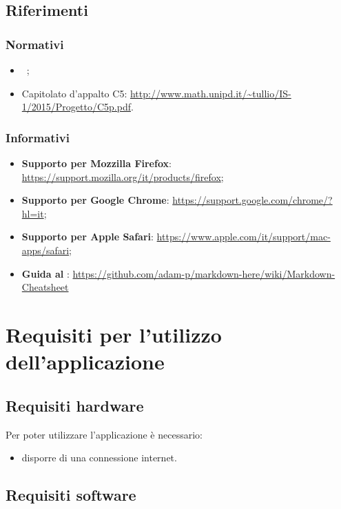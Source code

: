 \documentclass[12pt,a4paper]{article}
\begin{document}
	\subsection{Riferimenti}
	
\subsubsection{Normativi}
\begin{itemize}
	\item \NdPv\ ;
	\item Capitolato d'appalto C5: \url{http://www.math.unipd.it/~tullio/IS-1/2015/Progetto/C5p.pdf}.
\end{itemize}

\subsubsection{Informativi}
\begin{itemize}
	\item \textbf{Supporto per Mozzilla Firefox}: \url{https://support.mozilla.org/it/products/firefox};
	\item \textbf{Supporto per Google Chrome}: \url{https://support.google.com/chrome/?hl=it};
	\item \textbf{Supporto per Apple Safari}: \url{https://www.apple.com/it/support/mac-apps/safari};
	\item \textbf{Guida al }: \url{https://github.com/adam-p/markdown-here/wiki/Markdown-Cheatsheet}
\end{itemize}

	\newpage
	\section{Requisiti per l'utilizzo dell'applicazione} 
	\subsection{Requisiti hardware}
	Per poter utilizzare l'applicazione \prj{} è necessario:
	\begin{itemize}
		\item disporre di una connessione internet.
	\end{itemize}
	\subsection{Requisiti software}
	
\end{document}
